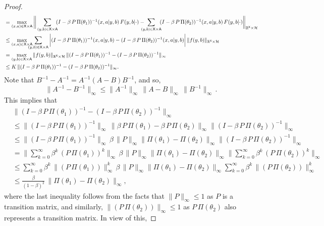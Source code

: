 \documentclass[11pt]{article}
\newcommand{\R}{\mathbb{R}}
\newcommand{\sX}{{\mathsf X}}
\newcommand{\sA}{{\mathsf A}}
\newcommand{\cH}{{\mathcal H}}
\begin{document}
\begin{proof}
\begin{align*}
&= \max_{(x,a) \in \sX \times \sA} \bigg\|\sum_{(y,b) \in \sX \times \sA} \!\! (I -\beta \, P \, \Pi(\theta_1))^{-1}(x,a|y,b) \, F(y,b|\cdot) -  \!\!\!\!\!\sum_{(y,b) \in \sX \times \sA} \!\! (I -\beta \, P \, \Pi(\theta_2))^{-1}(x,a|y,b) \, F(y,b|\cdot) \bigg\|_{\R^{\sX} \times \cH} \\
&\leq \max_{(x,a) \in \sX \times \sA} \hspace{-10pt} \sum_{(y,b) \in \sX \times \sA} \bigg| (I -\beta \, P \, \Pi(\theta_1))^{-1}(x,a|y,b) - (I -\beta \, P \, \Pi(\theta_2))^{-1}(x,a|y,b) \bigg| \, \|f(y,b)\|_{\R^{\sX} \times \cH} \\
&= \max_{(y,b) \in \sX \times \sA} \|f(y,b)\|_{\R^{\sX} \times \cH} \, \|(I -\beta \, P \, \Pi(\theta_1))^{-1} -(I -\beta \, P \, \Pi(\theta_2))^{-1}\|_{\infty} \\
&\leq K \, \|(I -\beta \, P \, \Pi(\theta_1))^{-1}-(I -\beta \, P \, \Pi(\theta_2))^{-1}\|_{\infty}.
\end{align*}
\normalsize
Note that $B^{-1} - A^{-1} = A^{-1} (A-B) B^{-1}$, and so, $$\|A^{-1} - B^{-1}\|_{\infty} \leq \|A^{-1}\|_{\infty} \, \|A-B\|_{\infty} \, \|B^{-1}\|_{\infty} \,.$$ This implies that 
\begin{align*}
&\|(I -\beta \, P \, \Pi(\theta_1))^{-1}-(I -\beta \, P \, \Pi(\theta_2))^{-1}\|_{\infty} \\
&\leq \|(I -\beta \, P \, \Pi(\theta_1))^{-1}\|_{\infty} \, \|\beta \, P \, \Pi(\theta_1) - \beta \, P \, \Pi(\theta_2)\|_{\infty}  \|(I -\beta \, P \, \Pi(\theta_2))^{-1}\|_{\infty} \\
&\leq \|(I -\beta \, P \, \Pi(\theta_1))^{-1}\|_{\infty} \, \beta \, \|P\|_{\infty} \|\Pi(\theta_1) - \Pi(\theta_2)\|_{\infty}  \|(I -\beta \, P \, \Pi(\theta_2))^{-1}\|_{\infty} \\ 
&= \bigg \|\sum_{k=0}^{\infty} \beta^k \, (P \, \Pi(\theta_1))^{k} \bigg\|_{\infty}  \, \beta \, \|P\|_{\infty} \|\Pi(\theta_1) - \Pi(\theta_2)\|_{\infty}   \bigg \|\sum_{k=0}^{\infty} \beta^k \, (P \, \Pi(\theta_2))^{k} \bigg\|_{\infty} \\
&\leq \sum_{k=0}^{\infty} \beta^k \,  \|(P \, \Pi(\theta_1))\|_{\infty}^k  \, \beta \, \|P\|_{\infty} \|\Pi(\theta_1) - \Pi(\theta_2)\|_{\infty} \sum_{k=0}^{\infty} \beta^k \, \|(P \, \Pi(\theta_2))\|_{\infty}^k \\
&\leq \frac{\beta}{(1-\beta)^2} \, \|\Pi(\theta_1) - \Pi(\theta_2)\|_{\infty},
\end{align*}
where the last inequality follows from the facts that $\|P\|_{\infty} \leq 1$ as $P$ is a transition matrix, and similarly, $\|(P \, \Pi(\theta_2))\|_{\infty} \leq 1$ as $P \, \Pi(\theta_2)$ also represents a transition matrix. In view of this,

\end{proof}
\end{document}
